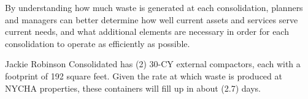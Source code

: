 
    By understanding how much waste is generated at each consolidation, planners and managers
    can better determine how well current assets and services serve current needs, and what additional 
    elements are necessary in order for each consolidation to operate as efficiently as possible. 

    Jackie Robinson Consolidated has (2) 30-CY external compactors, each with a footprint of 192 square feet. Given the rate at which waste is produced at NYCHA properties, these containers will fill
    up in about (2.7) days.